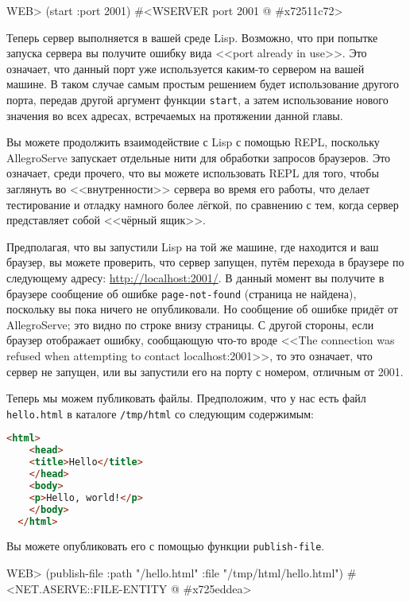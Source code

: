\begin{myverb}
  WEB> (start :port 2001)
  #<WSERVER port 2001 @ #x72511c72>
\end{myverb}

Теперь сервер выполняется в вашей среде Lisp. Возможно, что при попытке запуска сервера вы
получите ошибку вида <<port already in use>>. Это означает, что данный порт уже
используется каким-то сервером на вашей машине. В таком случае самым простым решением
будет использование другого порта, передав другой аргумент функции \lstinline{start}, а затем
использование нового значения во всех адресах, встречаемых на протяжении данной главы.

Вы можете продолжить взаимодействие с Lisp с помощью REPL, поскольку AllegroServe
запускает отдельные нити для обработки запросов браузеров. Это означает, среди прочего,
что вы можете использовать REPL для того, чтобы заглянуть во <<внутренности>> сервера во
время его работы, что делает тестирование и отладку намного более лёгкой, по сравнению с
тем, когда сервер представляет собой <<чёрный ящик>>.

Предполагая, что вы запустили Lisp на той же машине, где находится и ваш браузер, вы
можете проверить, что сервер запущен, путём перехода в браузере по следующему адресу:
\url{http://localhost:2001/}. В данный момент вы получите в браузере сообщение об ошибке
\lstinline{page-not-found} (страница не найдена), поскольку вы пока ничего не опубликовали. Но
сообщение об ошибке придёт от AllegroServe; это видно по строке внизу страницы. С другой
стороны, если браузер отображает ошибку, сообщающую что-то вроде <<The connection was
refused when attempting to contact localhost:2001>>, то это означает, что сервер не
запущен, или вы запустили его на порту с номером, отличным от 2001.

Теперь мы можем публиковать файлы. Предположим, что у нас есть файл \lstinline{hello.html} в
каталоге \lstinline{/tmp/html} со следующим содержимым:

\begin{lstlisting}[language=HTML]
  <html>
    <head>
    <title>Hello</title>
    </head>
    <body>
    <p>Hello, world!</p>
    </body>
  </html>
\end{lstlisting}

Вы можете опубликовать его с помощью функции \lstinline{publish-file}.

\begin{myverb}
  WEB> (publish-file :path "/hello.html" :file "/tmp/html/hello.html")
  #<NET.ASERVE::FILE-ENTITY @ #x725eddea>
\end{myverb}

